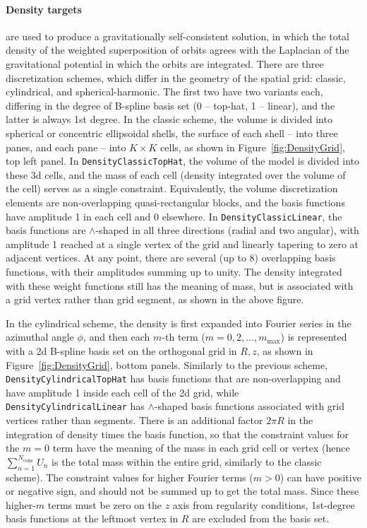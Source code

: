 \documentclass[12pt]{article}
\newcommand{\ppp}[1]{\textcolor{darkolive} {\texttt{#1}}}
\let\oldparagraph\paragraph
\renewcommand{\paragraph}[1]{\vspace{-2mm}\oldparagraph{#1}}
\begin{document}
\paragraph{Density targets} are used to produce a gravitationally self-consistent solution, in which the total density of the weighted superposition of orbits agrees with the Laplacian of the gravitational potential in which the orbits are integrated.
There are three discretization schemes, which differ in the geometry of the spatial grid: classic, cylindrical, and spherical-harmonic. The first two have two variants each, differing in the degree of B-spline basis set (0 -- top-hat, 1 -- linear), and the latter is always 1st degree. 
In the classic scheme, the volume is divided into spherical or concentric ellipsoidal shells, the surface of each shell -- into three panes, and each pane -- into $K\times K$ cells, as shown in Figure~\ref{fig:DensityGrid}, top left panel. In \ppp{DensityClassicTopHat}, the volume of the model is divided into these 3d cells, and the mass of each cell (density integrated over the volume of the cell) serves as a single constraint. Equivalently, the volume discretization elements are non-overlapping quasi-rectangular blocks, and the basis functions have amplitude 1 in each cell and 0 elsewhere. In \ppp{DensityClassicLinear}, the basis functions are $\wedge$-shaped in all three directions (radial and two angular), with amplitude 1 reached at a single vertex of the grid and linearly tapering to zero at adjacent vertices. At any point, there are several (up to 8) overlapping basis functions, with their amplitudes summing up to unity. The density integrated with these weight functions still has the meaning of mass, but is associated with a grid vertex rather than grid segment, as shown in the above figure.

In the cylindrical scheme, the density is first expanded into Fourier series in the azimuthal angle $\phi$, and then each $m$-th term ($m=0, 2, \dots, m_\mathrm{max}$) is represented with a 2d B-spline basis set on the orthogonal grid in $R,z$, as shown in Figure~\ref{fig:DensityGrid}, bottom panels. Similarly to the previous scheme, \ppp{DensityCylindricalTopHat} has basis functions that are non-overlapping and have amplitude 1 inside each cell of the 2d grid, while \ppp{DensityCylindricalLinear} has $\wedge$-shaped basis functions associated with grid vertices rather than segments. There is an additional factor $2\pi R$ in the integration of density times the basis function, so that the constraint values for the $m=0$ term have the meaning of the mass in each grid cell or vertex (hence $\sum_{n=1}^{N_\mathrm{cons}} U_n$ is the total mass within the entire grid, similarly to the classic scheme). The constraint values for higher Fourier terms ($m>0$) can have positive or negative sign, and should not be summed up to get the total mass. Since these higher-$m$ terms must be zero on the $z$ axis from regularity conditions, 1st-degree basis functions at the leftmost vertex in $R$ are excluded from the basis set.
\end{document}
